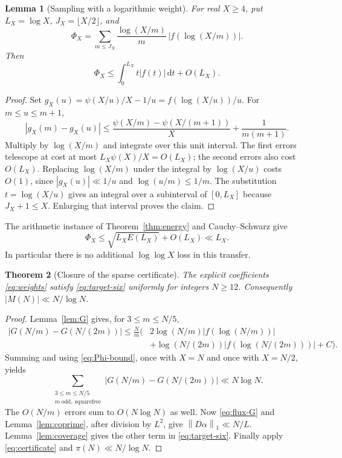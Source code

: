 \documentclass[11pt,letterpaper]{article}
\numberwithin{equation}{section}
\newtheorem{theorem}{Theorem}[section]
\newtheorem{lemma}[theorem]{Lemma}
\theoremstyle{definition}
\theoremstyle{remark}
\newcommand{\dd}{\,\mathrm d}
\newcommand{\norm}[1]{\left\lVert#1\right\rVert}
\begin{document}
\begin{lemma}[Sampling with a logarithmic weight]\label{lem:sampling}
For real $X\ge4$, put $L_X=\log X$, $J_X=\lfloor X/2\rfloor$, and
\[
 \Phi_X=\sum_{m\le J_X}\frac{\log(X/m)}m\,|f(\log(X/m))|.
\]
Then
\begin{equation}\label{eq:sampling}
 \Phi_X\le\int_0^{L_X}t|f(t)|\dd t+O(L_X).
\end{equation}
\end{lemma}
\begin{proof}
Set $g_X(u)=\psi(X/u)/X-1/u=f(\log(X/u))/u$.
For $m\le u\le m+1$,
\[
 |g_X(m)-g_X(u)|
 \le\frac{\psi(X/m)-\psi(X/(m+1))}{X}+\frac1{m(m+1)}.
\]
Multiply by $\log(X/m)$ and integrate over this unit interval.
The first errors telescope at cost at most $L_X\psi(X)/X=O(L_X)$;
the second errors also cost $O(L_X)$.
Replacing $\log(X/m)$ under the integral by $\log(X/u)$ costs $O(1)$,
since $|g_X(u)|\ll1/u$ and $\log(u/m)\le1/m$.
The substitution $t=\log(X/u)$ gives an integral over a subinterval of
$[0,L_X]$ because $J_X+1\le X$. Enlarging that interval proves the claim.
\end{proof}

The arithmetic instance of Theorem~\ref{thm:energy} and Cauchy--Schwarz give
\begin{equation}\label{eq:Phi-bound}
 \Phi_X\le\sqrt{L_X E(L_X)}+O(L_X)\ll L_X.
\end{equation}
In particular there is no additional $\log\log X$ loss in this transfer.

\begin{theorem}[Closure of the sparse certificate]\label{thm:certificate}
The explicit coefficients \eqref{eq:weights} satisfy \eqref{eq:target-six}
uniformly for integers $N\ge12$. Consequently $|M(N)|\ll N/\log N$.
\end{theorem}
\begin{proof}
Lemma~\ref{lem:G} gives, for $3\le m\le N/5$,
\begin{align*}
 |G(N/m)-G(N/(2m))|
 \le\frac Nm\bigl(&2\log(N/m)|f(\log(N/m))|\\
                 &+\log(N/(2m))|f(\log(N/(2m)))|+C\bigr).
\end{align*}
Summing and using \eqref{eq:Phi-bound}, once with $X=N$ and once with
$X=N/2$, yields
\begin{equation}\label{eq:cofactor-tail}
 \sum_{\substack{3\le m\le N/5\\m\ \mathrm{odd,\ squarefree}}}
       |G(N/m)-G(N/(2m))|\ll N\log N.
\end{equation}
The $O(N/m)$ errors sum to $O(N\log N)$ as well.
Now \eqref{eq:flux-G} and Lemma~\ref{lem:coprime}, after division by $L^2$,
give $\norm{D\alpha}_1\ll N/L$. Lemma~\ref{lem:coverage} gives the other
term in \eqref{eq:target-six}.
Finally apply \eqref{eq:certificate} and $\pi(N)\ll N/\log N$.
\end{proof}
\end{document}
